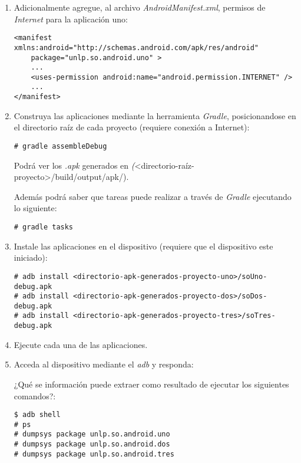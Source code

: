 \begin{itemize}
\begin{enumerate}
    \item Adicionalmente agregue, al archivo \textit{AndroidManifest.xml},  permisos de \emph{Internet} para la aplicación uno:
    \begin{lstlisting}
<manifest xmlns:android="http://schemas.android.com/apk/res/android"
    package="unlp.so.android.uno" >
    ...
    <uses-permission android:name="android.permission.INTERNET" />
    ...
</manifest>
    \end{lstlisting}
    
    \item Construya las aplicaciones mediante la herramienta \textit{Gradle}, posicionandose en el directorio raíz de cada proyecto (requiere conexión a Internet):
    \begin{lstlisting}
# gradle assembleDebug
    \end{lstlisting}
    Podrá ver los \textit{.apk} generados en \emph(<directorio-raíz-proyecto>/build/output/apk/). 
    
    Además podrá saber que tareas puede realizar a través de \textit{Gradle} ejecutando lo siguiente:
    \begin{lstlisting}
# gradle tasks
    \end{lstlisting}
     
    \item Instale las aplicaciones en el dispositivo (requiere que el dispositivo este iniciado):
    \begin{lstlisting}
# adb install <directorio-apk-generados-proyecto-uno>/soUno-debug.apk
# adb install <directorio-apk-generados-proyecto-dos>/soDos-debug.apk
# adb install <directorio-apk-generados-proyecto-tres>/soTres-debug.apk
    \end{lstlisting}
    
    \item Ejecute cada una de las aplicaciones.
    
    \item Acceda al dispositivo mediante el \textit{adb} y responda:
    \begin{questions}
        \question ¿Qué se información puede extraer como resultado de ejecutar los siguientes comandos?:
        \begin{lstlisting}
$ adb shell
# ps        
# dumpsys package unlp.so.android.uno
# dumpsys package unlp.so.android.dos
# dumpsys package unlp.so.android.tres
        \end{lstlisting}
    \end{questions}
    

\end{enumerate}
\end{itemize}
